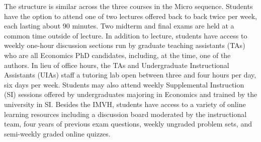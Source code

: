 \documentclass[12pt]{article}
\begin{document}

The structure is similar across the three courses in the Micro sequence. Students have the option to attend one of two lectures offered back to back twice per week, each lasting about 90 minutes. Two midterm and final exams are held at a common time outside of lecture. In addition to lecture, students have access to weekly one-hour discussion sections run by graduate teaching assistants (TAs) who are all Economics PhD candidates, including, at the time, one of the authors. In lieu of office hours, the TAs and Undergraduate Instructional Assistants (UIAs) staff a tutoring lab open between three and four hours per day, six days per week. Students may also attend weekly Supplemental Instruction (SI) sessions offered by undergraduates majoring in Economics and trained by the university in SI. Besides the IMVH, students have access to a variety of online learning resources including a discussion board moderated by the instructional team, four years of previous exam questions, weekly ungraded problem sets, and semi-weekly graded online quizzes.


\end{document}
